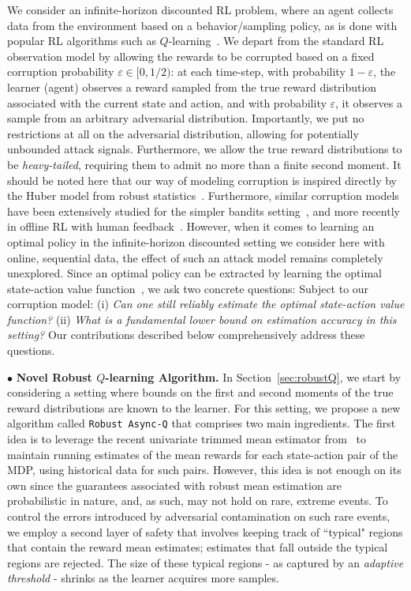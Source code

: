 \documentclass{article}
\begin{document}
We consider an infinite-horizon discounted RL problem, where an agent collects data from the environment based on a behavior/sampling policy, as is done with popular RL algorithms such as \(Q\)-learning~\cite{watkins1992q}. We depart from the standard RL observation model by allowing the rewards to be corrupted based on a fixed corruption probability $\varepsilon \in [0, 1/2)$: at each time-step, with probability $1-\varepsilon$, the learner (agent) observes a reward sampled from the true reward distribution associated with the current state and action, and with probability $\varepsilon$, it observes a sample from an arbitrary adversarial distribution. Importantly, we put no restrictions at all on the adversarial distribution, allowing for potentially unbounded attack signals. Furthermore, we allow the true reward distributions to be \emph{heavy-tailed}, requiring them to admit no more than a finite second moment. It should be noted here that our way of modeling corruption is inspired directly by the Huber model from robust statistics~\citep{huber, huber2}. Furthermore, similar corruption models have been extensively studied for the simpler bandits setting~\citep{junadv, lykouris, liuadv, guptaadv, kapoor, crimed}, and more recently in offline RL with human feedback~\cite{mandal2024corruption}. However, when it comes to learning an optimal policy in the infinite-horizon discounted setting we consider here with online, sequential data, the effect of such an attack model remains completely unexplored. Since an optimal policy can be extracted by learning the optimal state-action value function~\cite{sutton1988}, we ask two concrete questions: Subject to our corruption model: (i) \emph{Can one still reliably estimate the optimal state-action value function?} (ii) \emph{What is a fundamental lower bound on estimation accuracy in this setting?} Our contributions described below comprehensively address these questions. 

$ \bullet$ \textbf{Novel Robust \(Q\)-learning Algorithm.} In Section~\ref{sec:robustQ}, we start by considering a setting where bounds on the first and second moments of the true reward distributions are known to the learner. For this setting, we propose a new algorithm called \texttt{Robust Async-Q} that comprises two main ingredients. The first idea is to leverage the recent univariate trimmed mean estimator from~\citet{lugosi} to maintain running estimates of the mean rewards for each state-action pair of the MDP, using historical data for such pairs. However, this idea is not enough on its own since the guarantees associated with robust mean estimation are probabilistic in nature, and, as such, may not hold on rare, extreme events. To control the errors introduced by adversarial contamination on such rare events, we employ a second layer of safety that involves keeping track of ``typical" regions that contain the reward mean estimates; estimates that fall outside the typical regions are rejected. The size of these typical regions - as captured by an \emph{adaptive threshold} - shrinks as the learner acquires more samples. 
\end{document}
